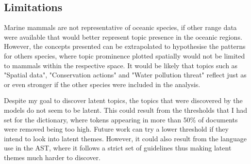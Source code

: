 \subsection{Limitations}
Marine mammals are not representative of oceanic species, if other range data were available that would better represent topic presence in the oceanic regions. However, the concepts presented can be extrapolated to hypothesise the patterns for others species, where topic prominence plotted spatially would not be limited to mammals within the respective space. It would be likely that topics such as "Spatial data", "Conservation actions" and "Water pollution threat" reflect just as or even stronger if the other species were included in the analysis.

Despite my goal to discover latent topics, the topics that were discovered by the models do not seem to be latent. This could result from the thresholds that I had set for the dictionary, where tokens appearing in more than 50\% of documents were removed being too high. Future work can try a lower threshold if they intend to look into latent themes. However, it could also result from the language use in the AST, where it follows a strict set of guidelines thus making latent themes much harder to discover.
